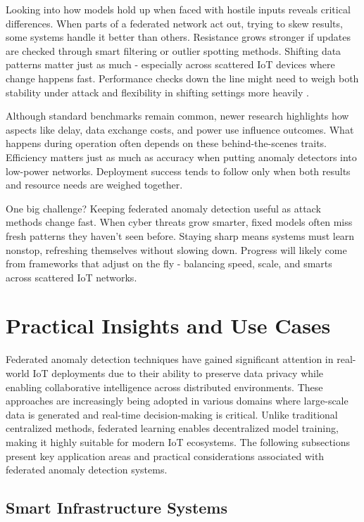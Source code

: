 \documentclass[12pt]{article}
\begin{document}
Looking into how models hold up when faced with hostile inputs reveals critical differences. When parts of a federated network act out, trying to skew results, some systems handle it better than others. Resistance grows stronger if updates are checked through smart filtering or outlier spotting methods. Shifting data patterns matter just as much - especially across scattered IoT devices where change happens fast. Performance checks down the line might need to weigh both stability under attack and flexibility in shifting settings more heavily \cite{paper7,paper8}.

Although standard benchmarks remain common, newer research highlights how aspects like delay, data exchange costs, and power use influence outcomes. What happens during operation often depends on these behind-the-scenes traits. Efficiency matters just as much as accuracy when putting anomaly detectors into low-power networks. Deployment success tends to follow only when both results and resource needs are weighed together.

One big challenge? Keeping federated anomaly detection useful as attack methods change fast. When cyber threats grow smarter, fixed models often miss fresh patterns they haven’t seen before. Staying sharp means systems must learn nonstop, refreshing themselves without slowing down. Progress will likely come from frameworks that adjust on the fly - balancing speed, scale, and smarts across scattered IoT networks.


	\section{Practical Insights and Use Cases}

Federated anomaly detection techniques have gained significant attention in real-world IoT deployments due to their ability to preserve data privacy while enabling collaborative intelligence across distributed environments. These approaches are increasingly being adopted in various domains where large-scale data is generated and real-time decision-making is critical. Unlike traditional centralized methods, federated learning enables decentralized model training, making it highly suitable for modern IoT ecosystems. The following subsections present key application areas and practical considerations associated with federated anomaly detection systems.

\subsection{Smart Infrastructure Systems}
\end{document}
